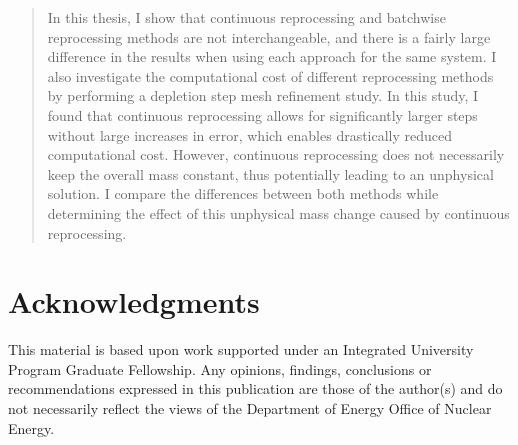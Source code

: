 \documentclass[edeposit,fullpage,hidelinks]{uiucthesis2018}
\begin{document}
\begin{abstract}
In this thesis, I show that continuous reprocessing and batchwise reprocessing methods are not interchangeable, and there is a fairly large difference in the results when using each approach for the same system.
I also investigate the computational cost of different reprocessing methods by performing a depletion step mesh refinement study.
In this study, I found that continuous reprocessing allows for significantly larger steps without large increases in error, which enables drastically reduced computational cost.
However, continuous reprocessing does not necessarily keep the overall mass constant, thus potentially leading to an unphysical solution.
I compare the differences between both methods while determining the effect of this unphysical mass change caused by continuous reprocessing.


\end{abstract}

\chapter*{Acknowledgments}

This material is based upon work supported under an Integrated University Program Graduate Fellowship.
Any opinions, findings, conclusions or recommendations expressed in this publication are
those of the author(s) and do not necessarily reflect the views of the Department of Energy
Office of Nuclear Energy.


\end{document}
